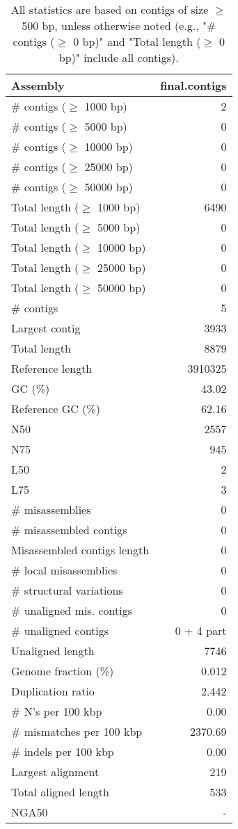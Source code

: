 \documentclass[12pt,a4paper]{article}
\begin{document}
\begin{table}[ht]
\begin{center}
\caption{All statistics are based on contigs of size $\geq$ 500 bp, unless otherwise noted (e.g., "\# contigs ($\geq$ 0 bp)" and "Total length ($\geq$ 0 bp)" include all contigs).}
\begin{tabular}{|l*{1}{|r}|}
\hline
Assembly & final.contigs \\ \hline
\# contigs ($\geq$ 1000 bp) & 2 \\ \hline
\# contigs ($\geq$ 5000 bp) & 0 \\ \hline
\# contigs ($\geq$ 10000 bp) & 0 \\ \hline
\# contigs ($\geq$ 25000 bp) & 0 \\ \hline
\# contigs ($\geq$ 50000 bp) & 0 \\ \hline
Total length ($\geq$ 1000 bp) & 6490 \\ \hline
Total length ($\geq$ 5000 bp) & 0 \\ \hline
Total length ($\geq$ 10000 bp) & 0 \\ \hline
Total length ($\geq$ 25000 bp) & 0 \\ \hline
Total length ($\geq$ 50000 bp) & 0 \\ \hline
\# contigs & 5 \\ \hline
Largest contig & 3933 \\ \hline
Total length & 8879 \\ \hline
Reference length & 3910325 \\ \hline
GC (\%) & 43.02 \\ \hline
Reference GC (\%) & 62.16 \\ \hline
N50 & 2557 \\ \hline
N75 & 945 \\ \hline
L50 & 2 \\ \hline
L75 & 3 \\ \hline
\# misassemblies & 0 \\ \hline
\# misassembled contigs & 0 \\ \hline
Misassembled contigs length & 0 \\ \hline
\# local misassemblies & 0 \\ \hline
\# structural variations & 0 \\ \hline
\# unaligned mis. contigs & 0 \\ \hline
\# unaligned contigs & 0 + 4 part \\ \hline
Unaligned length & 7746 \\ \hline
Genome fraction (\%) & 0.012 \\ \hline
Duplication ratio & 2.442 \\ \hline
\# N's per 100 kbp & 0.00 \\ \hline
\# mismatches per 100 kbp & 2370.69 \\ \hline
\# indels per 100 kbp & 0.00 \\ \hline
Largest alignment & 219 \\ \hline
Total aligned length & 533 \\ \hline
NGA50 & - \\ \hline
\end{tabular}
\end{center}
\end{table}
\end{document}
